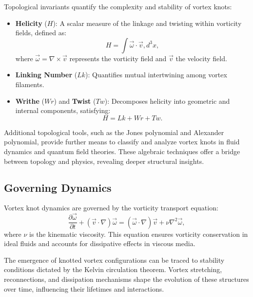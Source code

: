 Topological invariants quantify the complexity and stability of vortex knots:


\begin{itemize}

\item 
\textbf{Helicity} ($H$): A scalar measure of the linkage and twisting within vorticity fields, defined as:
\begin{equation*}
H = \int \vec{\omega} \cdot \vec{v} , d^3x,
\end{equation*}
where $\vec{\omega} = \nabla \times \vec{v}$ represents the vorticity field and $\vec{v}$ the velocity field.




\item 
\textbf{Linking Number} ($Lk$): Quantifies mutual intertwining among vortex filaments.




\item 
\textbf{Writhe} ($Wr$) and \textbf{Twist} ($Tw$): Decomposes helicity into geometric and internal components, satisfying:
\begin{equation*}
H = Lk + Wr + Tw.
\end{equation*}




\end{itemize}

Additional topological tools, such as the Jones polynomial and Alexander polynomial, provide further means to classify and analyze vortex knots in fluid dynamics and quantum field theories. These algebraic techniques offer a bridge between topology and physics, revealing deeper structural insights.


\subsection*{Governing Dynamics}


Vortex knot dynamics are governed by the vorticity transport equation:
\begin{equation*}
\frac{\partial \vec{\omega}}{\partial t} + (\vec{v} \cdot \nabla) \vec{\omega} = (\vec{\omega} \cdot \nabla) \vec{v} + \nu \nabla^2 \vec{\omega},
\end{equation*}
where $\nu$ is the kinematic viscosity. This equation ensures vorticity conservation in ideal fluids and accounts for dissipative effects in viscous media.


The emergence of knotted vortex configurations can be traced to stability conditions dictated by the Kelvin circulation theorem. Vortex stretching, reconnections, and dissipation mechanisms shape the evolution of these structures over time, influencing their lifetimes and interactions.


